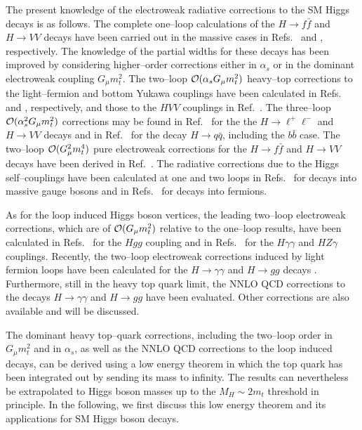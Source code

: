 The present knowledge of the electroweak radiative corrections to the SM Higgs
decays is as follows.  The complete one--loop calculations of the $H \to f\bar
f$ and $H\to VV$ decays have been carried out in the massive cases in
Refs.~\cite{RCcha,RChff} and \cite{RCcha,RChvv}, respectively. The knowledge of
the partial widths for these decays has been improved by considering
higher--order corrections either in $\alpha_s$ or in the dominant electroweak
coupling $G_\mu m_t^2$.   The two--loop ${\cal O}(\alpha_s G_\mu m_t^2)$
heavy--top corrections to the light--fermion and bottom Yukawa couplings have
been calculated in Refs.~\cite{RCalb,RCadj} and \cite{RChbb}, respectively, and
those to the $HVV$ couplings in Ref.~\cite{RCsea}. The three--loop ${\cal
O}(\alpha_s^2 G_\mu m_t^2)$ corrections may be found in Ref.~\cite{RCmat} for
the the $H \to \ell^+ \ell^-$ and $H\to VV$ decays and in Ref.~\cite{RCkos} for
the decay $H\to q\bar q$, including the $b\bar b$ case.  The two--loop ${\cal
O}(G_\mu^2 m_t^4)$ pure electroweak corrections for the $H\to f \bar{f}$ and
$H\to VV$ decays have been derived in Ref.~\cite{RCdgk}.  The radiative
corrections due to the Higgs self--couplings have been calculated at one and
two loops in Refs.~\cite{Pert-HWcplg1,Pert-HWcplg2} for decays into massive
gauge bosons and in Refs.~\cite{Pert-HWcplg1,Pert-Hfcplg2} for decays into
fermions.\s

As for the loop induced Higgs boson vertices, the leading two--loop electroweak
corrections, which are of ${\cal O}(G_\mu m_t^2)$ relative to the one--loop
results,  have been calculated in  Refs.~\cite{RCdjo} for the  $Hgg$
coupling and in Refs.~\cite{RCdgk,RChppnew} for the $H\gamma \gamma$ and
$HZ\gamma$ couplings.  Recently, the two--loop electroweak corrections induced
by light fermion loops have been calculated for the $H\to \gamma \gamma$ and
$H\to gg$ decays \cite{RCita,PepeHgg}. Furthermore, still in the heavy top 
quark limit, the NNLO QCD corrections to the decays $H \to \gamma \gamma$ 
\cite{RCste} and $H \to gg$ \cite{RChgg} have been evaluated. Other
corrections \cite{HqqQED-QCD,RCstegg,Hpp-MH2} are also available and will
be discussed. \s

The dominant heavy top--quark corrections, including the two--loop order in 
$G_\mu m_t^2$ and in $\alpha_s$, as well as the NNLO QCD corrections to the 
loop induced decays, can be derived using a low energy theorem in which the top
quark has been integrated out by sending its mass to infinity. The results can 
nevertheless be extrapolated to Higgs boson masses up to the $M_H \sim 2m_t$
threshold in principle. In the following, we first discuss this low energy 
theorem and its applications for SM Higgs boson decays. 


